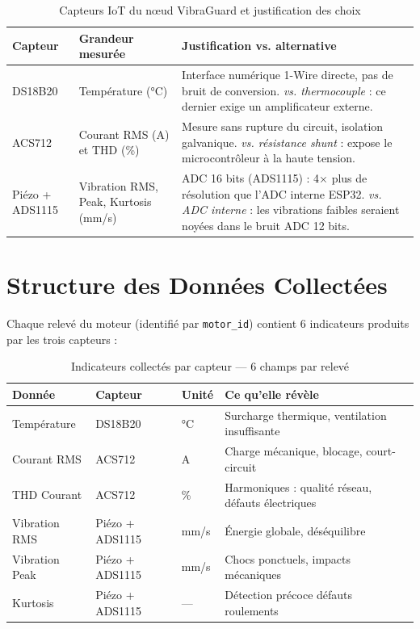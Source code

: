 \documentclass[12pt, a4paper, oneside]{report}
\begin{document}
\begin{table}[H]
  \centering
  \begin{tabularx}{\textwidth}{L{2.5cm} L{4cm} L{5.5cm}}
    \toprule
    \textbf{Capteur} &
    \textbf{Grandeur mesurée} &
    \textbf{Justification vs. alternative} \\
    \midrule
    DS18B20 & Température (°C) & Interface numérique 1-Wire directe, pas de bruit de conversion.
    \textit{vs. thermocouple} : ce dernier exige un amplificateur externe. \\
    ACS712 & Courant RMS (A) et THD (\%) & Mesure sans rupture du circuit, isolation galvanique.
    \textit{vs. résistance shunt} : expose le microcontrôleur à la haute tension. \\
    Piézo + ADS1115 & Vibration RMS, Peak, Kurtosis (mm/s) & ADC 16 bits (ADS1115) :
    4× plus de résolution que l'ADC interne ESP32. \textit{vs. ADC interne} :
    les vibrations faibles seraient noyées dans le bruit ADC 12 bits. \\
    \bottomrule
  \end{tabularx}
  \caption{Capteurs IoT du nœud VibraGuard et justification des choix}
\end{table}

\section{Structure des Données Collectées}

Chaque relevé du moteur (identifié par \texttt{motor\_id}) contient 6 indicateurs produits
par les trois capteurs :

\begin{table}[H]
  \centering
  \begin{tabularx}{\textwidth}{L{3cm} L{2.5cm} C{1.5cm} L{5cm}}
    \toprule
    \textbf{Donnée} &
    \textbf{Capteur} &
    \textbf{Unité} &
    \textbf{Ce qu'elle révèle} \\
    \midrule
           Température              & DS18B20           & °C      & Surcharge thermique, ventilation insuffisante \\
    Courant RMS              & ACS712            & A       & Charge mécanique, blocage, court-circuit \\
           THD Courant              & ACS712      & \%      & Harmoniques : qualité réseau, défauts électriques \\
    Vibration RMS            & Piézo + ADS1115   & mm/s    & Énergie globale, déséquilibre \\
           Vibration Peak           & Piézo + ADS1115   & mm/s    & Chocs ponctuels, impacts mécaniques \\
    Kurtosis                 & Piézo + ADS1115   & ---     & Détection précoce défauts roulements \\
    \bottomrule
  \end{tabularx}
  \caption{Indicateurs collectés par capteur — 6 champs par relevé}
\end{table}
\end{document}
